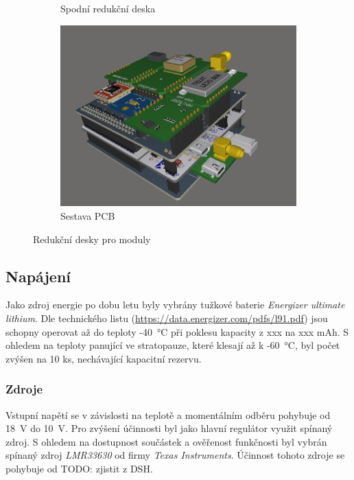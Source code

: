 \documentclass[twoside]{ctuthesis}
\theoremstyle{plain}
\theoremstyle{definition}
\theoremstyle{note}
\begin{document}
\begin{figure}[hbtp]
\begin{subfigure}{.3\textwidth}
				\caption{Spodní redukční deska}
				\label{fig:shield:bot}
			\end{subfigure}
			\begin{subfigure}{.3\textwidth}
				\centering
				\includegraphics[height=0.7\linewidth]{Figures/shield_assembly.png}
				\caption{Sestava PCB}
				\label{fig:shield:assembly}
			\end{subfigure}
			\caption{Redukční desky pro moduly}
			\label{fig:shields:pcb}
		\end{figure}

		\subsection{Napájení}
		Jako zdroj energie po dobu letu byly vybrány tužkové baterie \textit{Energizer ultimate lithium}. Dle technického listu (\url{https://data.energizer.com/pdfs/l91.pdf}) jsou schopny operovat až do teploty -40~°C při poklesu kapacity z xxx na xxx mAh. S ohledem na teploty panující ve stratopauze, které klesají až k -60~°C, byl počet zvýšen na 10 ks, nechávající kapacitní rezervu. 

			\subsubsection{Zdroje}
			Vstupní napětí se v závislosti na teplotě a momentálním odběru pohybuje od 18~V do 10~V. Pro zvýšení účinnosti byl jako hlavní regulátor využit spínaný zdroj. S ohledem na dostupnost součástek a ověřenost funkčnosti byl vybrán spínaný zdroj \textit{LMR33630} od firmy \textit{Texas Instruments}. Účinnost tohoto zdroje se pohybuje od TODO: zjistit z DSH. 
\end{document}
